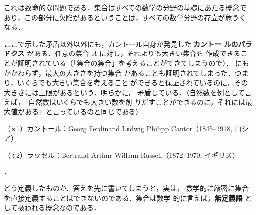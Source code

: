 {                        これは致命的な問題である．集合はすべての数学の分野の基礎にあたる概念で
                        あり，この部分に欠陥があるということは，すべての数学分野の存立が危うく
                        なる．

                        ここで示した矛盾以外以外にも，カントール自身が発見した \textbf{カントー
                        ルのパラドクス} がある．任意の集合 $A$ に対し，それよりも大きい集合を
                        作成できることが証明されている（「集合の集合」を考えることができてしまうので）．
                        にもかかわらず，最大の大きさを持つ集合
                        があることも証明されてしまった．つまり，いくらでも大きい集合を考えること
                        ができると保証されているのに，その大きさには上限があるという．明らかに，
                        矛盾している．（自然数を例として言えば，「自然数はいくらでも大きい数を創
                        りだすことができるのに，それには最大値がある」と言っているのと同じである）

                            （※1）カントール：Georg Ferdinand Ludwig Philipp Cantor（1845--1918, ロシア）

                            （※2）ラッセル：Bertrand Arthur William Russell（1872--1970, イギリス）
                    }．

                どう定義したものか．答えを先に書いてしまうと，実は，
                数学的に厳密に集合を直接定義することはできないのである．集合は数学
                的に言えば，\textbf{無定義語} として扱われる概念なのである．

